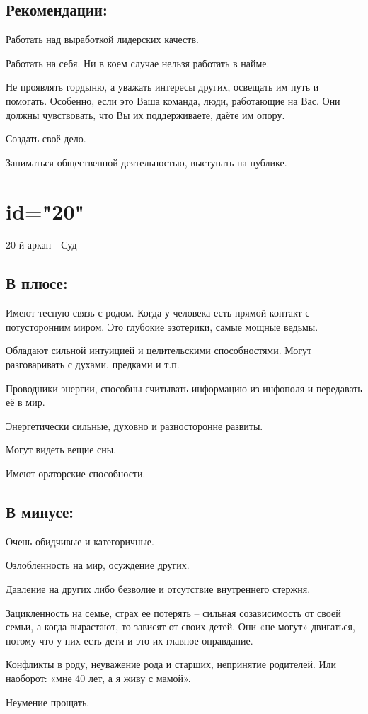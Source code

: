 \subsection{Рекомендации:}
\item Работать над выработкой лидерских качеств.
\item Работать на себя. Ни в коем случае нельзя работать в найме.
\item Не проявлять гордыню, а уважать интересы других, освещать им путь и помогать. Особенно, если это Ваша команда, люди, работающие на Вас. Они должны чувствовать, что Вы их поддерживаете, даёте им опору.
\item Создать своё дело.
\item Заниматься общественной деятельностью, выступать на публике.
\endsubsection

\endsection

\section{id="20"}{20-й аркан - Суд}

\subsection{В плюсе:}
\item Имеют тесную связь с родом. Когда у человека есть прямой контакт с потусторонним миром. Это глубокие эзотерики, самые мощные ведьмы.
\item Обладают сильной интуицией и целительскими способностями. Могут разговаривать с духами, предками и т.п.
\item Проводники энергии, способны считывать информацию из инфополя и передавать её в мир.
\item Энергетически сильные, духовно и разносторонне развиты.
\item Могут видеть вещие сны.
\item Имеют ораторские способности.
\endsubsection

\subsection{В минусе:}
\item Очень обидчивые и категоричные.
\item Озлобленность на мир, осуждение других.
\item Давление на других либо безволие и отсутствие внутреннего стержня.
\item Зацикленность на семье, страх ее потерять – сильная созависимость от своей семьи, а когда вырастают, то зависят от своих детей. Они «не могут» двигаться, потому что у них есть дети и это их главное оправдание.
\item Конфликты в роду, неуважение рода и старших, непринятие родителей. Или наоборот: «мне 40 лет, а я живу с мамой».
\item Неумение прощать.
\endsubsection

